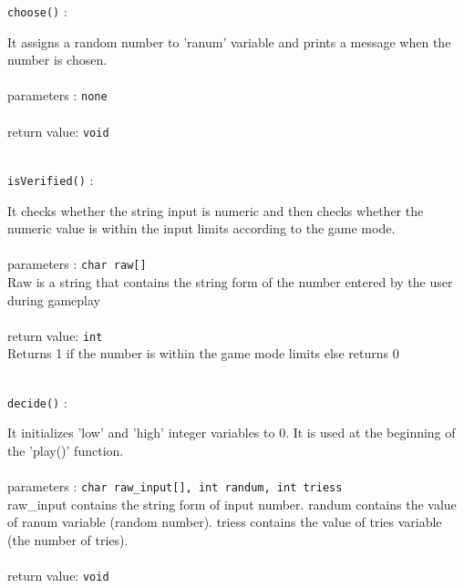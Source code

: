 \documentclass{report}
\begin{document}
\begin{flushleft}
\texttt{choose()}
\textsf{ : }
\end{flushleft}
\begin{flushright}
\hfill\begin{minipage}{0.85\linewidth}
	\textsf{		It assigns a random number to 'ranum' variable and prints a message when the number is chosen.} \\ \\
	\textsf{parameters : }
	\texttt{none} \\ \\
	\textsf{return value: }
	\texttt{void} \\ \\
\end{minipage}
\end{flushright}

\begin{flushleft}
\texttt{isVerified()}
\textsf{ : }
\end{flushleft}
\begin{flushright}
\hfill\begin{minipage}{0.85\linewidth}
	\textsf{		It checks whether the string input is numeric and then checks whether the numeric value is within the input limits according to the game mode.} \\ \\
	\textsf{parameters : }
	\texttt{char raw[]} \\ 
	\textsf{Raw is a string that contains the string form of the number entered by the user during gameplay} \\ \\
	\textsf{return value: }
	\texttt{int} \\
	\textsf{Returns 1 if the number is within the game mode limits else returns 0} \\ \\
\end{minipage}
\end{flushright}

\break

\begin{flushleft}
\texttt{decide()}
\textsf{ : }
\end{flushleft}
\begin{flushright}
\hfill\begin{minipage}{0.85\linewidth}
	\textsf{		It initializes 'low' and 'high' integer variables to 0. It is used at the beginning of the 'play()' function.} \\ \\
	\textsf{parameters : }
	\texttt{char raw\_input[],		int randum, 	int triess} \\ 
	\textsf{raw\_input contains the string form of input number. randum contains the value of ranum variable (random number). triess contains the value of tries variable (the number of tries).} \\ \\
	\textsf{return value: }
	\texttt{void} \\ \\
\end{minipage}
\end{flushright}
\end{document}
